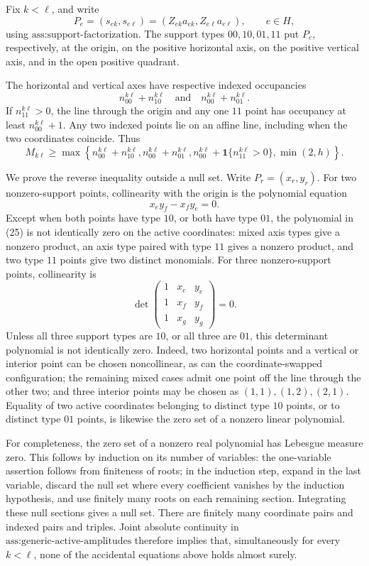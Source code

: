 Fix \(k<\ell\), and write
\[
 P_e=(s_{ek},s_{e\ell})=(Z_{ek}a_{ek},Z_{e\ell}a_{e\ell}),
 \qquad e\in H, \tag{22}
\]
using \(\text{ass:support-factorization}\).  The support types \(00,10,01,11\) put \(P_e\), respectively, at the origin, on the positive horizontal axis, on the positive vertical axis, and in the open positive quadrant.

The horizontal and vertical axes have respective indexed occupancies
\[
 n_{00}^{k\ell}+n_{10}^{k\ell}
 \quad\text{and}\quad
 n_{00}^{k\ell}+n_{01}^{k\ell}. \tag{23}
\]
If \(n_{11}^{k\ell}>0\), the line through the origin and any one \(11\) point has occupancy at least \(n_{00}^{k\ell}+1\).  Any two indexed points lie on an affine line, including when the two coordinates coincide.  Thus
\[
 M_{k\ell}\ge
 \max\!\left\{
 n_{00}^{k\ell}+n_{10}^{k\ell},
 n_{00}^{k\ell}+n_{01}^{k\ell},
 n_{00}^{k\ell}+\mathbf 1\{n_{11}^{k\ell}>0\},
 \min(2,h)
 \right\}. \tag{24}
\]

We prove the reverse inequality outside a null set.  Write \(P_r=(x_r,y_r)\).  For two nonzero-support points, collinearity with the origin is the polynomial equation
\[
 x_ey_f-x_fy_e=0. \tag{25}
\]
Except when both points have type \(10\), or both have type \(01\), the polynomial in (25) is not identically zero on the active coordinates: mixed axis types give a nonzero product, an axis type paired with type \(11\) gives a nonzero product, and two type \(11\) points give two distinct monomials.  For three nonzero-support points, collinearity is
\[
 \det\!\begin{pmatrix}
 1&x_e&y_e\\
 1&x_f&y_f\\
 1&x_g&y_g
 \end{pmatrix}=0. \tag{26}
\]
Unless all three support types are \(10\), or all three are \(01\), this determinant polynomial is not identically zero.  Indeed, two horizontal points and a vertical or interior point can be chosen noncollinear, as can the coordinate-swapped configuration; the remaining mixed cases admit one point off the line through the other two; and three interior points may be chosen as \((1,1),(1,2),(2,1)\).  Equality of two active coordinates belonging to distinct type \(10\) points, or to distinct type \(01\) points, is likewise the zero set of a nonzero linear polynomial.

For completeness, the zero set of a nonzero real polynomial has Lebesgue measure zero.  This follows by induction on its number of variables: the one-variable assertion follows from finiteness of roots; in the induction step, expand in the last variable, discard the null set where every coefficient vanishes by the induction hypothesis, and use finitely many roots on each remaining section.  Integrating these null sections gives a null set.  There are finitely many coordinate pairs and indexed pairs and triples.  Joint absolute continuity in \(\text{ass:generic-active-amplitudes}\) therefore implies that, simultaneously for every \(k<\ell\), none of the accidental equations above holds almost surely.

